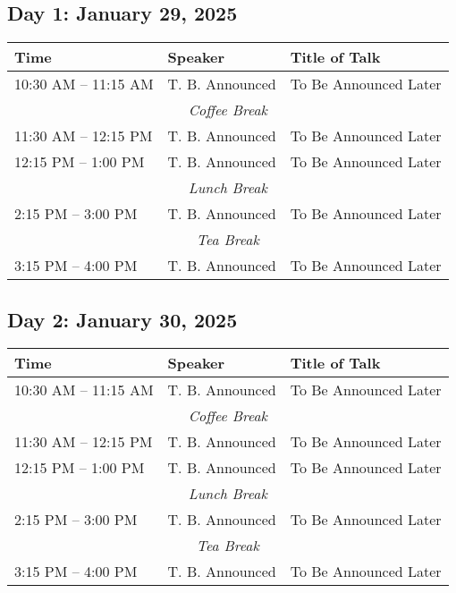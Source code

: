 %
%
\subsection*{Day 1: January 29, 2025}

\noindent
\renewcommand{\arraystretch}{1.5} %
\begin{tabular}{|p{3.5cm}|p{4cm}|p{7cm}|}
	\hline
	\textbf{Time} & \textbf{Speaker} & \textbf{Title of Talk} \\
	\hline
	10:30 AM -- 11:15 AM & T. B. Announced & To Be Announced Later \\
	\hline
	\multicolumn{3}{|c|}{\textit{Coffee Break}} \\
	\hline
	11:30 AM -- 12:15 PM & T. B. Announced & To Be Announced Later \\
	\hline
	12:15 PM -- 1:00 PM & T. B. Announced & To Be Announced Later \\
	\hline
	\multicolumn{3}{|c|}{\textit{Lunch Break}} \\
	\hline
	2:15 PM -- 3:00 PM & T. B. Announced & To Be Announced Later \\
	\hline
	\multicolumn{3}{|c|}{\textit{Tea Break}} \\
	\hline
	3:15 PM -- 4:00 PM & T. B. Announced & To Be Announced Later \\
	\hline
\end{tabular}


\subsection*{Day 2: January 30, 2025}

\noindent
\renewcommand{\arraystretch}{1.5} %
\begin{tabular}{|p{3.5cm}|p{4cm}|p{7cm}|}
	\hline
	\textbf{Time} & \textbf{Speaker} & \textbf{Title of Talk} \\
	\hline
	10:30 AM -- 11:15 AM & T. B. Announced & To Be Announced Later \\
	\hline
	\multicolumn{3}{|c|}{\textit{Coffee Break}} \\
	\hline
	11:30 AM -- 12:15 PM & T. B. Announced & To Be Announced Later \\
	\hline
	12:15 PM -- 1:00 PM & T. B. Announced & To Be Announced Later \\
	\hline
	\multicolumn{3}{|c|}{\textit{Lunch Break}} \\
	\hline
	2:15 PM -- 3:00 PM & T. B. Announced & To Be Announced Later \\
	\hline
	\multicolumn{3}{|c|}{\textit{Tea Break}} \\
	\hline
	3:15 PM -- 4:00 PM & T. B. Announced & To Be Announced Later \\
	\hline
\end{tabular}

